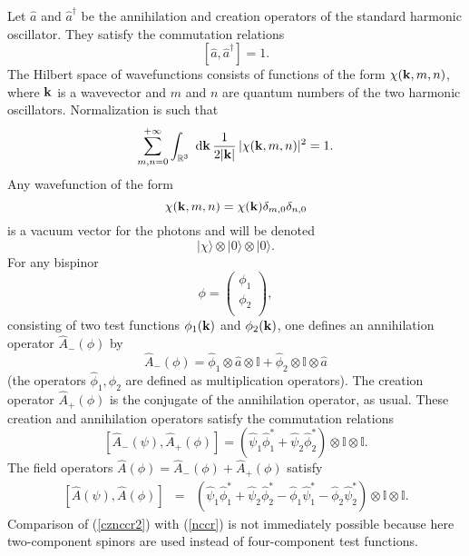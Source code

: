 \documentclass[12pt,a4paper]{article}
\def\Ro{{\mathbb R}}
\def\Io{{\mathbb I}}
\def\kk{{\bf k}}
\begin{document}
Let $\hat a$ and $\hat a^\dagger$ be the annihilation
and creation operators of the standard harmonic oscillator. They satisfy
the commutation relations
\begin{equation}
\left[\hat a,\hat a^\dagger\right]=1.
\end{equation}
%
The Hilbert space of wavefunctions consists of functions of the form
$\chi(\kk,m,n)$, where $\kk$ is a wavevector and $m$ and $n$ are
quantum numbers of the two harmonic oscillators. Normalization
is such that
\begin{equation}
\sum_{m,n=0}^{+\infty}\int_{\Ro^3}\hbox{ d}\kk\,\frac{1}{2|\kk|}
\,|\chi(\kk,m,n)|^2=1.
\end{equation}
%
Any wavefunction of the form
\begin{equation}
\chi(\kk,m,n)=\chi(\kk)\delta_{m,0}\delta_{n,0}
\end{equation}
is a vacuum vector for the photons and will be denoted
\begin{equation}
|\chi\rangle\otimes|0\rangle\otimes|0\rangle.
\end{equation}
%
For any bispinor
\begin{equation}
\phi =\left(\begin{array}{c}
\phi _1 \\
\phi _2 \\
\end{array}\right),
\end{equation}
consisting of two test functions $\phi_1(\kk)$ and $\phi_2(\kk)$,
one defines an annihilation operator $\hat A_-(\phi )$ by
\begin{equation}
\hat A_-(\phi )=\hat \phi _1\otimes \hat a\otimes\Io
+\hat \phi _2\otimes \Io\otimes \hat a
\label{amindef}
\end{equation}
(the operators $\hat \phi _1,\hat \phi _2$ are defined as multiplication
operators).
The creation operator $\hat A_+(\phi )$ is the conjugate
of the annihilation operator,
as usual. These creation and annihilation operators satisfy
the commutation relations
\begin{equation}
\left[\hat A_-(\psi ),\hat A_+(\phi )\right]
=\left(\hat \psi _1\hat \phi _1^*+\hat \psi _2\hat \phi ^*_2\right)\otimes \Io\otimes \Io.
\label{cznccr1}
\end{equation}
The field operators $\hat A(\phi )=\hat A_-(\phi )+\hat A_+(\phi )$
satisfy
\begin{eqnarray}
\left[\hat A(\psi ),\hat A(\phi )\right]
&=&\left(\hat \psi _1\hat \phi _1^*+\hat \psi _2\hat \phi ^*_2
-\hat \phi _1\hat \psi _1^*-\hat \phi _2\hat \psi ^*_2
\right)\otimes \Io\otimes \Io.
\label{cznccr2}
\end{eqnarray}
Comparison of (\ref{cznccr2})
with (\ref{nccr}) is not immediately possible because here two-component
spinors are used instead of four-component test functions.
\end{document}
